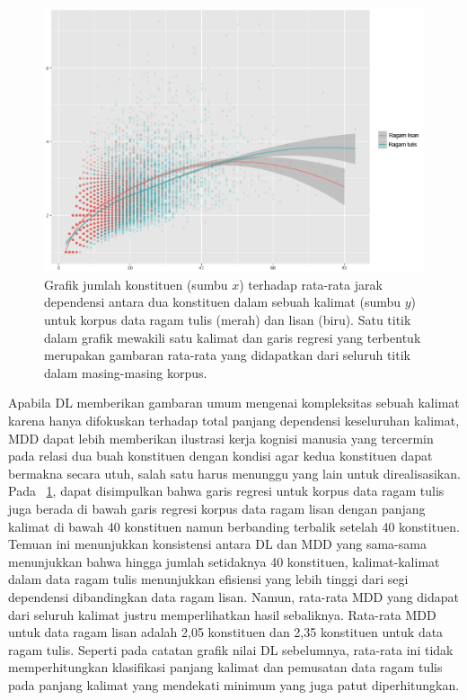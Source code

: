 \begin{figure}
	\centering \includegraphics[width=1
	\textwidth] {pics/lisantulis_MDD.png} 
	\caption{Grafik jumlah konstituen (sumbu $x$) terhadap rata-rata jarak dependensi antara dua konstituen dalam sebuah kalimat (sumbu $y$) untuk korpus data ragam tulis (merah) dan lisan (biru). Satu titik dalam grafik mewakili satu kalimat dan garis regresi yang terbentuk merupakan gambaran rata-rata yang didapatkan dari seluruh titik dalam masing-masing korpus.} 
\label{fig:lisantulis_MDD} 
\end{figure}

Apabila DL memberikan gambaran umum mengenai kompleksitas sebuah kalimat karena hanya difokuskan terhadap total panjang dependensi keseluruhan kalimat, MDD dapat lebih memberikan ilustrasi kerja kognisi manusia yang tercermin pada relasi dua buah konstituen dengan kondisi agar kedua konstituen dapat bermakna secara utuh, salah satu harus menunggu yang lain untuk direalisasikan. Pada \pic~\ref{fig:lisantulis_MDD}, dapat disimpulkan bahwa garis regresi untuk korpus data ragam tulis juga berada di bawah garis regresi korpus data ragam lisan dengan panjang kalimat di bawah 40 konstituen namun berbanding terbalik setelah 40 konstituen. Temuan ini menunjukkan konsistensi antara DL dan MDD yang sama-sama menunjukkan bahwa hingga jumlah setidaknya 40 konstituen, kalimat-kalimat dalam data ragam tulis menunjukkan efisiensi yang lebih tinggi dari segi dependensi dibandingkan data ragam lisan. Namun, rata-rata MDD yang didapat dari seluruh kalimat justru memperlihatkan hasil sebaliknya. Rata-rata MDD untuk data ragam lisan adalah 2,05 konstituen dan 2,35 konstituen untuk data ragam tulis. Seperti pada catatan grafik nilai DL sebelumnya, rata-rata ini tidak memperhitungkan klasifikasi panjang kalimat dan pemusatan data ragam tulis pada panjang kalimat yang mendekati minimum yang juga patut diperhitungkan.

